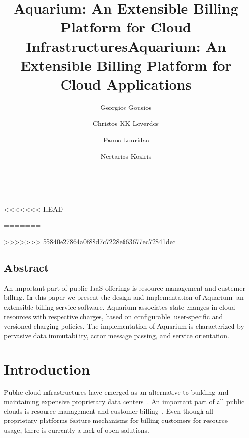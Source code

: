 \documentclass[letterpaper,twocolumn,10pt]{article}
\begin{document}
\date{}

<<<<<<< HEAD
\title{Aquarium: An Extensible Billing Platform for Cloud Infrastructures}
=======
\title{Aquarium: An Extensible Billing Platform for Cloud Applications}
>>>>>>> 55840e27864a0f88d7c7228e663677ec72841dcc

\author{
{\rm Georgios Gousios}\\
\and
{\rm Christos KK Loverdos}\\
\and
{\rm Panos Louridas}\\
\and
{\rm Nectarios Koziris}\\
\and
{}\\
} %

\maketitle


\thispagestyle{empty}

\subsection*{Abstract}

An important part of public IaaS offerings is resource management and
customer billing. In this paper we present the design and
implementation of Aquarium, an extensible billing service software.
Aquarium associates state changes in cloud resources with respective
charges, based on configurable, user-specific and versioned charging
policies. The implementation of Aquarium is characterized by pervasive
data immutability, actor message passing, and service orientation.

\section{Introduction}

Public cloud infrastructures have emerged as an alternative to
building and maintaining expensive proprietary data
centers~\cite{Lourid10}. An important part of all public clouds is
resource management and customer billing~\cite{Armbr10}. Even though
all proprietary platforms feature mechanisms for billing customers for
resource usage, there is currently a lack of open solutions.
\end{document}
